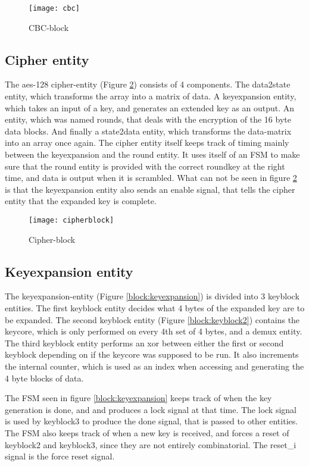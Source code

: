 \begin{figure}[h!]
  \centering
  \texttt{[image: cbc]}
  \caption{CBC-block}
  \label{block:cbc}
\end{figure}

\subsection{Cipher entity}
The aes-128 cipher-entity (Figure \ref{block:cipher}) consists of 4 
components. The data2state entity, which transforms the array into a 
matrix of data. A keyexpansion entity, which takes an input of a key, 
and generates an extended key as an output. An entity, which was named  
rounds, that deals with the encryption of the 16 byte data blocks. 
And finally a state2data entity, which transforms the data-matrix into 
an array once again. The cipher entity itself keeps track of timing 
mainly between the keyexpansion and the round entity. It uses itself of 
an FSM to make sure that the round entity is provided with the correct 
roundkey at the right time, and data is output when it is scrambled. 
What can not be seen in figure \ref{block:cipher} is that the 
keyexpansion entity also sends an enable signal, that tells the cipher 
entity that the expanded key is complete.

\begin{figure}[h!]
  \centering
  \texttt{[image: cipherblock]}
  \caption{Cipher-block}
  \label{block:cipher}
\end{figure}

\subsection{Keyexpansion entity}
The keyexpansion-entity (Figure \ref{block:keyexpansion}) is divided 
into 3 keyblock entities. The first keyblock entity decides what 4 
bytes of the expanded key are to be expanded. The second keyblock 
entity (Figure \ref{block:keyblock2}) contains the keycore, which is 
only performed on every 4th set of 4 bytes, and a demux entity. 
The third keyblock entity performs an xor between either the first or 
second keyblock depending on if the keycore was supposed to be run. It 
also increments the internal counter, which is used as an index when 
accessing and generating the 4 byte blocks of data.

The FSM seen in figure \ref{block:keyexpansion} keeps track of when the 
key generation is done, and and produces a lock signal at that time. 
The lock signal is used by keyblock3 to produce the done signal, that 
is passed to other entities. 
The FSM also keeps track of when a new key is received, and forces a 
reset of keyblock2 and keyblock3, since they are not entirely 
combinatorial. The reset\_i signal is the force reset signal. 

